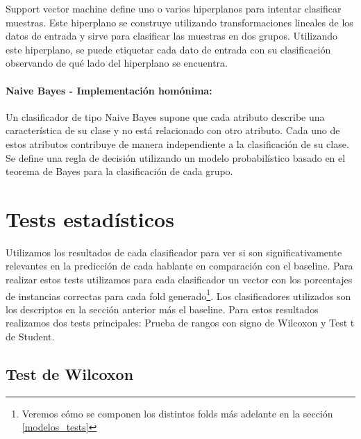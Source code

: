 
Support vector machine define uno o varios hiperplanos para intentar clasificar muestras. Este hiperplano se construye utilizando transformaciones lineales de los datos de entrada y sirve para clasificar las muestras en dos grupos. Utilizando este hiperplano, se puede etiquetar cada dato de entrada con su clasificación observando de qué lado del hiperplano se encuentra.

\paragraph{Naive Bayes \cite{DBLP:conf/flairs/Zhang04} - Implementación homónima:}


Un clasificador de tipo Naive Bayes supone que cada atributo describe una característica de su clase y no está relacionado con otro atributo. Cada uno de estos atributos contribuye de manera independiente a la clasificación de su clase. Se define una regla de decisión utilizando un modelo probabilístico basado en el teorema de Bayes para la clasificación de cada grupo.

\section{Tests estadísticos}

Utilizamos los resultados de cada clasificador para ver si son significativamente relevantes en la predicción de cada hablante en comparación con el baseline. Para realizar estos tests utilizamos para cada clasificador un vector con los porcentajes de instancias correctas para cada fold generado\footnote{Veremos cómo se componen los distintos folds más adelante en la sección \ref{modelos_tests}}. Los clasificadores utilizados son los descriptos en la sección anterior más el baseline. Para estos resultados realizamos dos tests principales: Prueba de rangos con signo de Wilcoxon y Test t de Student. 

\subsection{Test de Wilcoxon}


